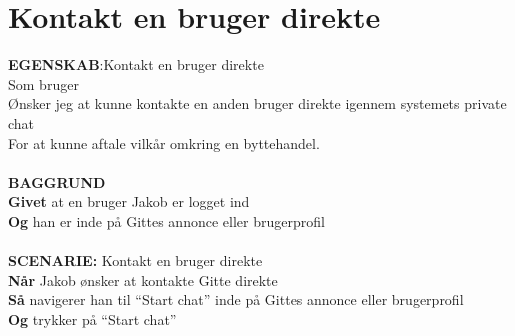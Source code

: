 \section{Kontakt en bruger direkte}
{\color{blue}\textbf{EGENSKAB}:}Kontakt en bruger direkte \\
Som bruger \\
Ønsker jeg at kunne kontakte en anden bruger direkte igennem systemets private chat \\
For at kunne aftale vilkår omkring en byttehandel.\\ \\
{\color{blue}\textbf{BAGGRUND}} \\
{\color{blue}\textbf{Givet}} at en bruger Jakob er logget ind \\
{\color{blue}\textbf{Og}} han er inde på Gittes annonce eller brugerprofil\\\\
{\color{blue}\textbf{SCENARIE:}} Kontakt en bruger direkte\\
{\color{blue}\textbf{Når}} Jakob ønsker at kontakte Gitte direkte\\
{\color{blue}\textbf{Så}} navigerer han til “Start chat” inde på Gittes annonce eller brugerprofil \\
{\color{blue}\textbf{Og}} trykker på “Start chat”